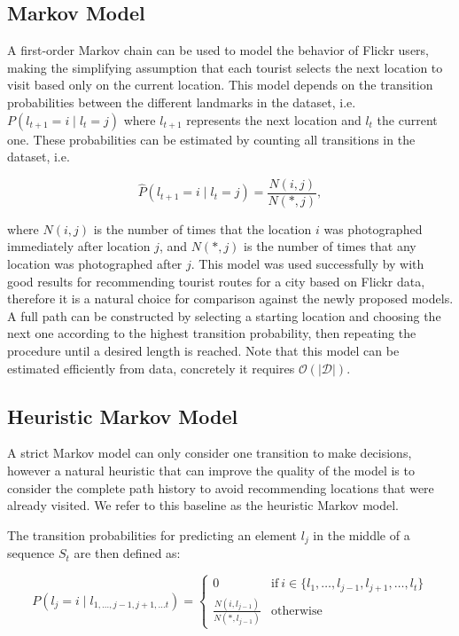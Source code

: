\subsection{Markov Model}

A first-order Markov chain can be used to model the behavior of Flickr users, making the simplifying assumption that each tourist selects the next location to visit based only on the current location. This model depends on the transition probabilities between the different landmarks in the dataset, i.e. $P(l_{t+1} = i \mid l_{t} = j)$ where $l_{t+1}$ represents the next location and $l_{t}$ the current one. These probabilities can be estimated by counting all transitions in the dataset, i.e.

\begin{equation}
  \hat{P}(l_{t+1} = i \mid l_{t} = j) = \frac{N(i,j)}{N(*,j)},
\end{equation}

where $N(i,j)$ is the number of times that the location $i$ was photographed immediately after location $j$, and $N(*, j)$ is the number of times that any location was photographed after $j$. This model was used successfully by \citet{Kurashima2010} with good results for recommending tourist routes for a city based on Flickr data, therefore it is a natural choice for comparison against the newly proposed models. A full path can be constructed by selecting a starting location and choosing the next one according to the highest transition probability, then repeating the procedure until a desired length is reached. Note that this model can be estimated efficiently from data, concretely it requires $\mathcal{O}(|\mathcal{D}|)$.

\subsection{Heuristic Markov Model}

A strict Markov model can only consider one transition to make decisions, however a natural heuristic that can improve the quality of the model is to consider the complete path history to avoid recommending locations that were already visited. We refer to this baseline as the heuristic Markov model.

The transition probabilities for predicting an element $l_{j}$ in the middle of a sequence $S_{t}$ are then defined as:

\begin{equation}
  P(l_{j} = i \mid l_{1, \dots, j-1, j+1, \dots t}) = \begin{cases}
  0 & \text{if}\ i \in \{l_{1}, \dots, l_{j-1}, l_{j+1}, \dots, l_{t}\} \\
  \frac{N(i,l_{j-1})}{N(*,l_{j-1})} & \text{otherwise}
  \end{cases}
\end{equation}


